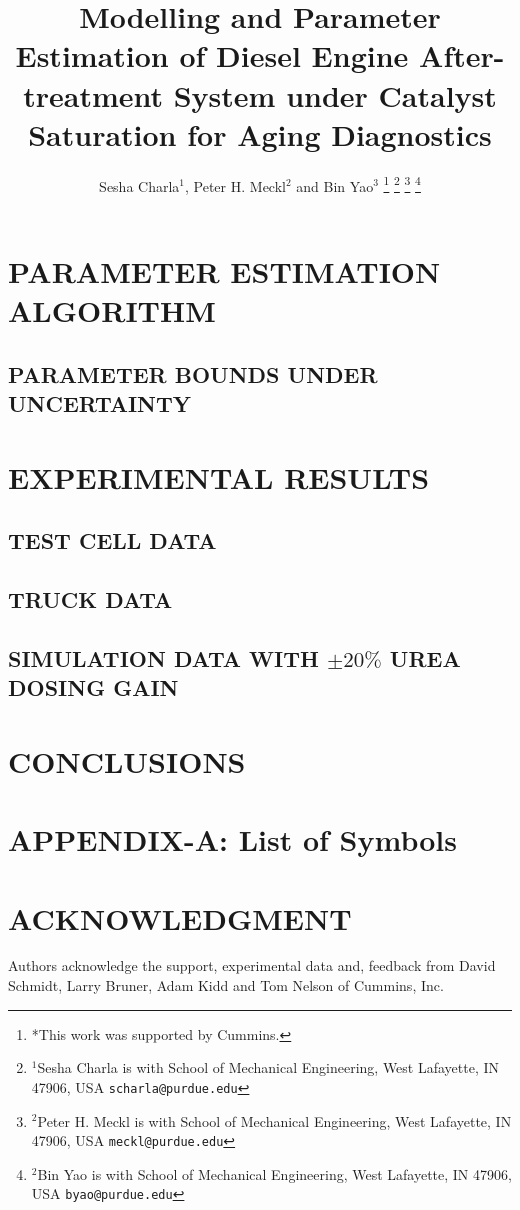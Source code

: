\documentclass[letterpaper, 10 pt, conference]{ieeeconf}  %
\title{\LARGE \bf
Modelling and Parameter Estimation of Diesel Engine After-treatment System under Catalyst Saturation for Aging Diagnostics
}
\author{Sesha Charla$^{1}$, Peter H. Meckl$^{2}$ and Bin Yao$^{3}$ %
\thanks{*This work was supported by Cummins.}%
\thanks{$^{1}$Sesha Charla is with School of Mechanical Engineering, West Lafayette, IN 47906, USA
        {\tt\small scharla@purdue.edu}}%
\thanks{$^{2}$Peter H. Meckl is with School of Mechanical Engineering, West Lafayette, IN 47906, USA
        {\tt\small meckl@purdue.edu}}%
\thanks{$^{2}$Bin Yao is with School of Mechanical Engineering, West Lafayette, IN 47906, USA
        {\tt\small byao@purdue.edu}}%
}
\begin{document}
\maketitle
\thispagestyle{empty}
\pagestyle{empty}


\begin{abstract}

\end{abstract}





\section{PARAMETER ESTIMATION ALGORITHM}
\subsection{PARAMETER BOUNDS UNDER UNCERTAINTY}

\section{EXPERIMENTAL RESULTS}
\subsection{TEST CELL DATA}
\subsection{TRUCK DATA}
\subsection{SIMULATION DATA WITH $\pm 20\%$ UREA DOSING GAIN}

\section{CONCLUSIONS}

\newpage
\section*{APPENDIX-A: List of Symbols}


\section*{ACKNOWLEDGMENT}
Authors acknowledge the support, experimental data and, feedback from David Schmidt, Larry
Bruner, Adam Kidd and Tom Nelson of Cummins, Inc.



\end{document}
